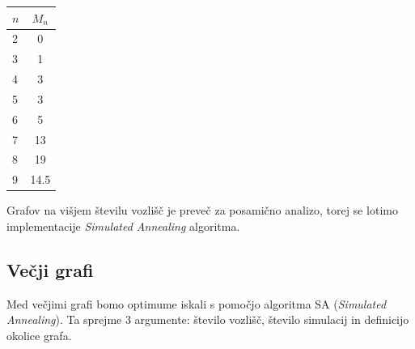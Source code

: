 \documentclass[ letterpaper, titlepage, fleqn]{article}
\begin{document}
\begin{center}
    \begin{tabular}{ l | c }
      $n$ & $M_n$ \\ \hline
      2 & 0 \\ 
      3 & 1 \\ 
      4 & 3 \\ 
      5 & 3 \\ 
      6 & 5 \\ 
      7 & 13 \\ 
      8 & 19 \\ 
      9 & 14.5 \\ 
    \end{tabular}
\end{center}

Grafov na višjem  številu vozlišč je preveč za posamično analizo, torej
se lotimo implementacije {\em Simulated Annealing} algoritma.

\subsection{Večji grafi}

Med večjimi grafi bomo optimume iskali s pomočjo algoritma SA ({\em Simulated Annealing}). 
Ta sprejme 3 argumente: število vozlišč, število simulacij in definicijo okolice grafa.
\end{document}
